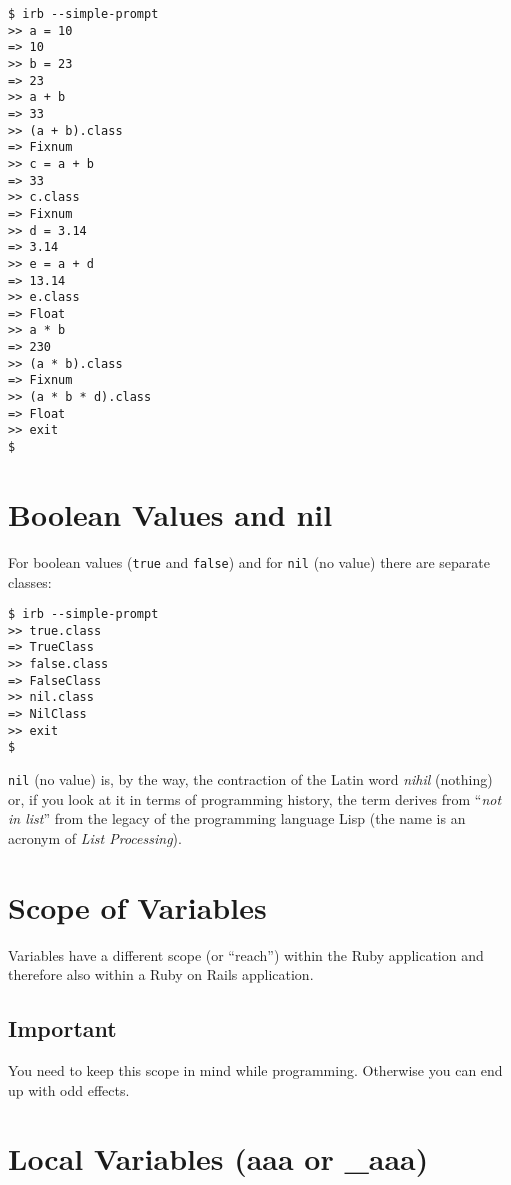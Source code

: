 \documentclass[a4paper]{book}
\begin{document}
\begin{shaded}\begin{verbatim}
$ irb --simple-prompt
>> a = 10
=> 10
>> b = 23
=> 23
>> a + b
=> 33
>> (a + b).class
=> Fixnum
>> c = a + b
=> 33
>> c.class
=> Fixnum
>> d = 3.14
=> 3.14
>> e = a + d
=> 13.14
>> e.class
=> Float
>> a * b
=> 230
>> (a * b).class
=> Fixnum
>> (a * b * d).class
=> Float
>> exit
$
\end{verbatim}\end{shaded}

\section{Boolean Values and nil}\label{boolean-values-and-nil}

For boolean values (\texttt{true} and \texttt{false}) and for \texttt{nil} (no value) there are separate classes:

\begin{shaded}\begin{verbatim}
$ irb --simple-prompt
>> true.class
=> TrueClass
>> false.class
=> FalseClass
>> nil.class
=> NilClass
>> exit
$
\end{verbatim}\end{shaded}

\texttt{nil} (no value) is, by the way, the contraction of the Latin word \emph{nihil} (nothing) or, if you look at it in terms of programming history, the term derives from “\emph{not in list}” from the legacy of the programming language Lisp (the name is an acronym of \emph{List Processing}).

\section{Scope of Variables}\label{scope-of-variables}

Variables have a different scope (or “reach”) within the Ruby application and therefore also within a Ruby on Rails application.

\subsection{Important}\label{important-2}

You need to keep this scope in mind while programming. Otherwise you can end up with odd effects.

\section{Local Variables (aaa or \_aaa)}\label{local-variables-aaa-or-ux5faaa}
\end{document}
